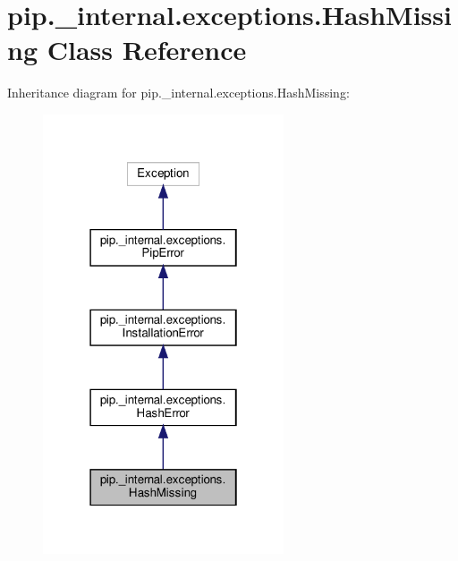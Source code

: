 \hypertarget{classpip_1_1__internal_1_1exceptions_1_1HashMissing}{}\section{pip.\+\_\+internal.\+exceptions.\+Hash\+Missing Class Reference}
\label{classpip_1_1__internal_1_1exceptions_1_1HashMissing}


Inheritance diagram for pip.\+\_\+internal.\+exceptions.\+Hash\+Missing\+:
\nopagebreak
\begin{figure}[H]
\begin{center}
\leavevmode
\includegraphics[width=202pt]{classpip_1_1__internal_1_1exceptions_1_1HashMissing__inherit__graph}
\end{center}
\end{figure}


